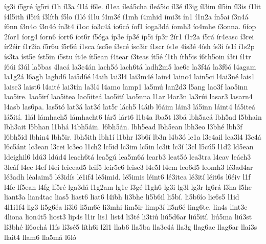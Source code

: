 {^^edg3i
^^ed5gr^^e9
^^edg5ri
^^ed1h
^^edl3a
^^ed1l^^e1
^^ed6le.
^^edl1ea
^^edle^^e15cha
^^edle^^e15ic
^^edl3^^e9
^^edl3ig
^^edl3im
^^edl5in
^^edl3is
^^ed1lit
^^ed4l5ith
^^edl5i^^fa
^^ed3l^^edth
^^ed5lo
^^ed1l^^f3
^^ed1lu
^^ed4m3^^e9
^^ed1mh
^^ed4mhid
^^edmi3t
^^edn1
^^ed1n2a
^^edn5ai
^^ed3n4^^e1
^^ed6nn
^^ed3n4o
^^ed3n4^^f3
^^edn3t4
^^ed1oc
^^edo3c4^^e1
^^edo6c^^f3
^^edof1
^^edoga3d^^e1
^^edomh3
^^edo4mhe
^^ed3onna.
6^^edop
2^^edor1
^^edorg4
^^edorn6
^^edort6
^^edot6r
^^ed5^^f3ga
^^edp3e
^^edp3^^e9
^^edp5i
^^edp3r
2^^edr1
^^ed1r2a
^^ed5r^^e1
^^edr4easc
^^ed3rei
^^edr2^^e9ir
^^ed1r2ia
^^ed5r6u
^^ed5r6^^fa
^^ed1sca
^^edsc5e
^^ed3sc^^e9
^^edsc3ir
^^ed1scr
^^eds1e
4^^eds3^^e9
4^^edsh
^^eds3i
^^eds1^^ed
^^ed1s2p
^^eds3ta
^^edst5e
^^edst5in
^^ed5stu
^^edt4e
^^edt5ean
^^ed4tear
^^ed3teas
^^edt5^^e9
^^ed1th
^^edth5is
^^ed6th5oin
^^ed3ti
^^ed1tr
^^ed6^^fai
^^ed3^^fal
la5bas
4lac^^e1
la3c4^^e1n
lach5^^f3
lach6t^^e1
ladh2m5
lae6c
la3f4^^e1
la3f6^^f3
l4agam
la1g2^^e1
l6agh
laghd6
lai5d6^^e9
l4aih
lai3l4
lai3m4^^e9
lain4
lainc4
lain5ci
l4ai3n^^e9
lais1
laisc3
laist6
l4ait^^e9
lai3t^^edn
la3l4
l4amo
lamp1
la5m^^fa
lan2d3
l5ang
lao3f
lao5inn
lao5ire.
lao5ir^^ed
lao5itea
lao5ite^^e1
lao5it^^ed
lao5nna
l1ar
l4ar3n
la3r^^fai
lasar3
lasarn4
l4asb
las6pa.
las5t^^f3
lat3^^e1
lat3^^f3
lat5r
l^^e1ch5
l4^^e1ib
l6^^e1im
l^^e1in3
l^^e15inn
l^^e1int4
l^^e15ite^^e1
l^^e15it^^ed.
1l^^e1l
l^^e1mhach5
l^^e1mhacht6
l^^e1r5
l^^e1rt6
l1b4a
lba5t
l3b^^e1
lbh5ac^^e1
lbh5ad
l5bhain
lbh3ait
l5bhan
l1bh^^e1
l4bh5^^e1in.
l6bh5^^e1n.
lbh5ead
lbh5ean
lbh3eo
l3bh^^e9
lbh3f
l6bh5id
lbhin4
lbh5ir.
lbh5ith
lbh1^^ed
l1bhr
l3b6^^ed
lb3n
l4b3^^f3
lc1a
l3c4ail
lca3l4
l3c4^^e1
l6c5^^e1nt
lc3ean
l3cei
lc3eo
l1ch2
lc5id
lc3im
lc5in
lc3it
lc3^^ed
l3cl
l5c^^fa5
l1d2
ld5ean
ldeighil6
ld^^fa3
ld^^fad4
leach6t^^e1
lea5g^^fa
lea5m6^^e1
learb3
leat5^^f3
lea3tra
l4eav
le^^e1ch3
3le^^e1f
l4ec
l4ef
l4ei
leicead5
leif5
leir5c6
leisc3
l4e5l
l4em
leo6d5
leomh3
l^^e93ad4ar
l^^e93adh
l^^e9alaim5
l^^e93id^^eds
l^^e91if4
l^^e95imid.
l^^e95imis
l^^e9int6
l^^e93itea
l^^e93it^^ed
l^^e9it6s
l6^^e9iv
l1f
l4fc
lf5ean
l4fg
lf5r^^e9
lga3d^^e1
l1g2am
lg1e
l3g^^e9
l1gh6
lg3i
lg3l
lg3r
lg6r^^e1
l3ha
l5he
liant3a
lian4tac
lias5
liast6
liat6
l4ibh
li3bhe
li5b6il
li5b^^ed.
li5b6^^edo
lic6s5
l1id
4l1i1f4
lig3
li5g6^^e9a
li3l6
li5m6^^e9
li3mhi
lim5ir
limp3^^ed
li5n6^^e9
ling6te.
lin4s
lint3e
4liona
lion4t5
liost3
lip4s
l1ir
lis1
list4
li3t^^e9
li3ti^^fa
li^^fa5d6ar
li^^fa5it^^ed.
li^^fa5ma
li^^fa3st
l^^ed3bh^^e9
l^^ed6och^^e1
l1^^eds
l^^ed3s^^e95
l^^edth6i
l2l1
llab6
lla5ba
lla3c4^^e1
lla3g
llag6ac
llag6ar
llai3s
llait4
llam6
lla5m^^e1
l6l^^f3
}
